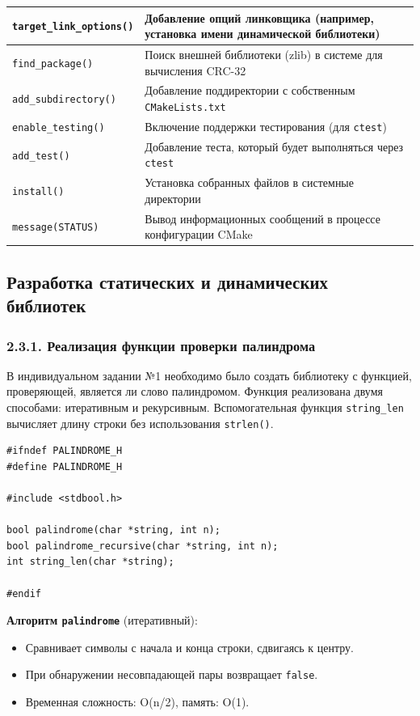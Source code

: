 \documentclass[14pt]{extreport}
\begin{document}
{\begin{table}[H]
\begin{footnotesize}
\begin{tabular}{|p{6cm}|p{10cm}|}
\hline
    \texttt{target\_link\_options()} & Добавление опций линковщика (например, установка имени динамической библиотеки) \\
\hline
    \texttt{find\_package()} & Поиск внешней библиотеки (zlib) в системе для вычисления CRC-32 \\
\hline
    \texttt{add\_subdirectory()} & Добавление поддиректории с собственным \texttt{CMakeLists.txt} \\
\hline
    \texttt{enable\_testing()} & Включение поддержки тестирования (для \texttt{ctest}) \\
\hline
    \texttt{add\_test()} & Добавление теста, который будет выполняться через \texttt{ctest} \\
\hline
    \texttt{install()} & Установка собранных файлов в системные директории \\
\hline
    \texttt{message(STATUS)} & Вывод информационных сообщений в процессе конфигурации CMake \\
\hline
    \end{tabular}
\end{footnotesize}
\end{table}
{\centering\subsection{Разработка статических и динамических библиотек}}

{\centering\subsubsection*{2.3.1. Реализация функции проверки палиндрома}}

В индивидуальном задании №1 необходимо было создать библиотеку с функцией, проверяющей, является ли слово палиндромом. Функция реализована двумя способами: итеративным и рекурсивным. Вспомогательная функция \texttt{string\_len} вычисляет длину строки без использования \texttt{strlen()}.

\begin{verbatim}
#ifndef PALINDROME_H
#define PALINDROME_H

#include <stdbool.h>

bool palindrome(char *string, int n);
bool palindrome_recursive(char *string, int n);
int string_len(char *string);

#endif
\end{verbatim}

\textbf{Алгоритм \texttt{palindrome}} (итеративный):
\begin{itemize}
    \item Сравнивает символы с начала и конца строки, сдвигаясь к центру.
    \item При обнаружении несовпадающей пары возвращает \texttt{false}.
    \item Временная сложность: O(n/2), память: O(1).
\end{itemize}

}
\end{document}
